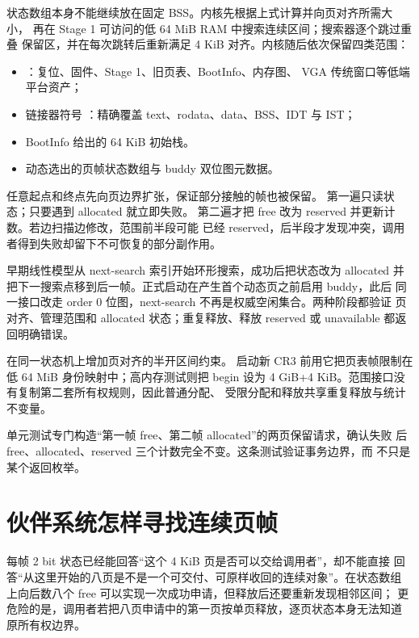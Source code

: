 状态数组本身不能继续放在固定 BSS。内核先根据上式计算并向页对齐所需大小，
再在 Stage 1 可访问的低 64 MiB RAM 中搜索连续区间；搜索器逐个跳过重叠
保留区，并在每次跳转后重新满足 4 KiB 对齐。内核随后依次保留四类范围：

\begin{itemize}
  \item \code{[0,1 MiB)}：复位、固件、Stage 1、旧页表、BootInfo、内存图、
        VGA 传统窗口等低端平台资产；
  \item 链接器符号 ：精确覆盖
        text、rodata、data、BSS、IDT 与 IST；
  \item BootInfo 给出的 64 KiB 初始栈。
  \item 动态选出的页帧状态数组与 buddy 双位图元数据。
\end{itemize}

任意起点和终点先向页边界扩张，保证部分接触的帧也被保留。
 第一遍只读状态；只要遇到 allocated 就立即失败。
第二遍才把 free 改为 reserved 并更新计数。若边扫描边修改，范围前半段可能
已经 reserved，后半段才发现冲突，调用者得到失败却留下不可恢复的部分副作用。

早期线性模型从 next-search 索引开始环形搜索，成功后把状态改为 allocated
并把下一搜索点移到后一帧。正式启动在产生首个动态页之前启用 buddy，此后
同一接口改走 order 0 位图，next-search 不再是权威空闲集合。两种阶段都验证
页对齐、管理范围和 allocated 状态；重复释放、释放 reserved 或 unavailable
都返回明确错误。

 在同一状态机上增加页对齐的半开区间约束。
启动新 CR3 前用它把页表帧限制在低 64 MiB 身份映射中；高内存测试则把
begin 设为 4 GiB+4 KiB。范围接口没有复制第二套所有权规则，因此普通分配、
受限分配和释放共享重复释放与统计不变量。

单元测试专门构造“第一帧 free、第二帧 allocated”的两页保留请求，确认失败
后 free、allocated、reserved 三个计数完全不变。这条测试验证事务边界，而
不只是某个返回枚举。

\section{伙伴系统怎样寻找连续页帧}
每帧 2 bit 状态已经能回答“这个 4 KiB 页是否可以交给调用者”，却不能直接
回答“从这里开始的八页是不是一个可交付、可原样收回的连续对象”。在状态数组
上向后数八个 free 可以实现一次成功申请，但释放后还要重新发现相邻区间；
更危险的是，调用者若把八页申请中的第一页按单页释放，逐页状态本身无法知道
原所有权边界。

